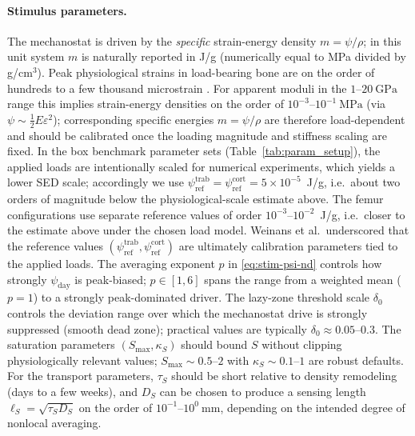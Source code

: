 \paragraph{Stimulus parameters.}
The mechanostat is driven by the \emph{specific} strain-energy density $m=\psi/\rho$; in this unit system $m$ is naturally reported in J/g (numerically equal to MPa divided by g/cm$^3$).
Peak physiological strains in load-bearing bone are on the order of hundreds to a few thousand microstrain \cite{Turner1998_ThreeRulesBone,Robling2006}.
For apparent moduli in the $1$--$20~\mathrm{GPa}$ range this implies strain-energy densities on the order of $10^{-3}$--$10^{-1}~\mathrm{MPa}$ (via $\psi\sim\tfrac12 E\varepsilon^2$); corresponding specific energies $m=\psi/\rho$ are therefore load-dependent and should be calibrated once the loading magnitude and stiffness scaling are fixed.
In the box benchmark parameter sets (Table~\ref{tab:param_setup}), the applied loads are intentionally scaled for numerical experiments, which yields a lower SED scale; accordingly we use $\psi_{\mathrm{ref}}^{\mathrm{trab}}=\psi_{\mathrm{ref}}^{\mathrm{cort}}=5\times 10^{-5}$~J/g, i.e.\ about two orders of magnitude below the physiological-scale estimate above.
The femur configurations use separate reference values of order $10^{-3}$--$10^{-2}$~J/g, i.e.\ closer to the estimate above under the chosen load model.
Weinans et al.\ underscored that the reference values $(\psi_{\mathrm{ref}}^{\mathrm{trab}},\psi_{\mathrm{ref}}^{\mathrm{cort}})$ are ultimately calibration parameters tied to the applied loads.
The averaging exponent $p$ in \eqref{eq:stim-psi-nd} controls how strongly $\psi_{\mathrm{day}}$ is peak-biased; $p\in[1,6]$ spans the range from a weighted mean ($p=1$) to a strongly peak-dominated driver.
The lazy-zone threshold scale $\delta_0$ controls the deviation range over which the mechanostat drive is strongly suppressed (smooth dead zone); practical values are typically $\delta_0\approx 0.05$--$0.3$.
The saturation parameters $(S_{\max},\kappa_S)$ should bound $S$ without clipping physiologically relevant values; $S_{\max}\sim 0.5$--$2$ with $\kappa_S\sim 0.1$--$1$ are robust defaults.
For the transport parameters, $\tau_S$ should be short relative to density remodeling (days to a few weeks), and $D_S$ can be chosen to produce a sensing length $\ell_S=\sqrt{\tau_S D_S}$ on the order of $10^{-1}$--$10^{0}~\mathrm{mm}$, depending on the intended degree of nonlocal averaging.


